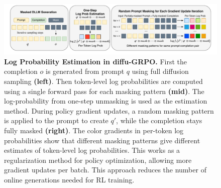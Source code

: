 \begin{figure}[ht]
    {\centering
    \includegraphics[width=1.0\textwidth]{figs/diffu_grpo.pdf}
    \par}
    \caption{\textbf{Log Probability Estimation in diffu-GRPO.} First the completion $o$ is generated from prompt $q$ using full diffusion sampling \textbf{(left)}. Then token-level log probabilities are computed using a single forward pass for each masking pattern \textbf{(mid)}. The log-probability from one-step unmasking is used as the estimation method. During policy gradient updates, a random masking pattern is applied to the prompt to create $q'$, while the completion stays fully masked \textbf{(right)}. The color gradients in per-token log probabilities show that different masking patterns give different estimates of token-level log probabilities. This works as a regularization method for policy optimization, allowing more gradient updates per batch. This approach reduces the number of online generations needed for RL training.}
    \label{fig:diffu-GRPO}
\end{figure}

% 
% 
